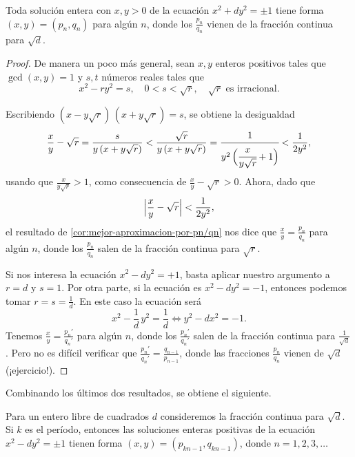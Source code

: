 \begin{proposicion}
  Toda solución entera con $x,y > 0$ de la ecuación $x^2 + dy^2 = \pm 1$ tiene
  forma $(x,y) = (p_n,q_n)$ para algún $n$, donde los $\frac{p_n}{q_n}$ vienen
  de la fracción continua para $\sqrt{d}$.

  \begin{proof}
    De manera un poco más general, sean $x,y$ enteros positivos tales que
    $\gcd (x,y) = 1$ y $s,t$ números reales tales que
    \[ x^2 - ry^2 = s, \quad
       0 < s < \sqrt{r}, \quad
       \sqrt{r}\text{ es irracional}. \]

    Escribiendo $(x - y\sqrt{r})\,(x + y\sqrt{r}) = s$, se obtiene
    la desigualdad
    \[ \frac{x}{y} - \sqrt{r} = \frac{s}{y\,(x + y\sqrt{r})} <
    \frac{\sqrt{r}}{y\,(x + y\sqrt{r})} =
    \cfrac{1}{y^2\,\Bigl(\cfrac{x}{y\sqrt{r}} + 1\Bigr)} <
    \frac{1}{2y^2}, \]
    usando que $\frac{x}{y\sqrt{r}} > 1$, como consecuencia de
    $\frac{x}{y} - \sqrt{r} > 0$. Ahora, dado que
    $$\Bigl|\frac{x}{y} - \sqrt{r}\Bigr| < \frac{1}{2y^2},$$
    el resultado de \ref{cor:mejor-aproximacion-por-pn/qn} nos dice que
    $\frac{x}{y} = \frac{p_n}{q_n}$ para algún $n$, donde los $\frac{p_n}{q_n}$
    salen de la fracción continua para $\sqrt{r}$.

    Si nos interesa la ecuación $x^2 - dy^2 = +1$, basta aplicar nuestro
    argumento a $r = d$ y $s = 1$. Por otra parte, si la ecuación es
    $x^2 - dy^2 = -1$, entonces podemos tomar $r = s = \frac{1}{d}$. En este
    caso la ecuación será
    $$x^2 - \frac{1}{d}\,y^2 = \frac{1}{d} \iff y^2 - dx^2 = -1.$$
    Tenemos $\frac{x}{y} = \frac{p_n'}{q_n'}$ para algún $n$, donde los
    $\frac{p_n'}{q_n'}$ salen de la fracción continua para $\frac{1}{\sqrt{d}}$.
    Pero no es difícil verificar que
    $\frac{p_n'}{q_n'} = \frac{q_{n-1}}{p_{n-1}}$, donde las fracciones
    $\frac{p_n}{q_n}$ vienen de $\sqrt{d}$ (¡ejercicio!).
  \end{proof}
\end{proposicion}

Combinando los últimos dos resultados, se obtiene el siguiente.

\begin{teorema}
  Para un entero libre de cuadrados $d$ consideremos la fracción continua para
  $\sqrt{d}$. Si $k$ es el período, entonces las soluciones enteras positivas
  de la ecuación $x^2 - dy^2 = \pm 1$ tienen forma $(x,y) = (p_{kn-1}, q_{kn-1})$,
  donde $n = 1,2,3,\ldots$
\end{teorema}

